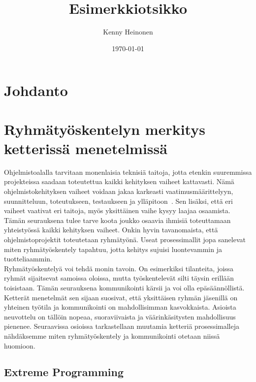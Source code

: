 \documentclass[finnish]{../tktltiki2}
\title{Esimerkkiotsikko}
\author{Kenny Heinonen}
\date{\today}
\theoremstyle{definition}
\theoremstyle{remark}
\begin{document}

\maketitle        %

\tableofcontents  %
\newpage          %



\section{Johdanto}

\section{Ryhmätyöskentelyn merkitys ketterissä menetelmissä}


Ohjelmistoalalla tarvitaan monenlaisia teknisiä taitoja, jotta etenkin suuremmissa projekteissa saadaan toteutettua kaikki kehityksen vaiheet kattavasti. Nämä ohjelmistokehityksen vaiheet voidaan jakaa karkeasti vaatimusmäärittelyyn, suunnitteluun, toteutukseen, testaukseen ja ylläpitoon~\cite{Capretz:2010:MSS:1726559.1726574}. Sen lisäksi, että eri vaiheet vaativat eri taitoja, myös yksittäinen vaihe kysyy laajaa osaamista. Tämän seurauksena tulee tarve koota joukko osaavia ihmisiä toteuttamaan yhteistyössä kaikki kehityksen vaiheet. Onkin hyvin tavanomaista, että ohjelmistoprojektit toteutetaan ryhmätyönä. Useat prosessimallit jopa sanelevat miten ryhmätyöskentely tapahtuu, jotta kehitys sujuisi luontevammin ja tuotteliaammin.\\

Ryhmätyöskentelyä voi tehdä monin tavoin. On esimerkiksi tilanteita, joissa ryhmät sijaitsevat samoissa oloissa, mutta työskentelevät silti täysin erillään toisistaan. Tämän seurauksena kommunikointi kärsii ja voi olla epäsäännöllistä. Ketterät menetelmät sen sijaan suosivat, että yksittäisen ryhmän jäsenillä on yhteinen työtila ja kommunikointi on mahdollisimman kasvokkaista. Asioista neuvottelu on tällöin nopeaa, suoraviivaista ja väärinkäsitysten mahdollisuus pienenee. Seuraavissa osioissa tarkastellaan muutamia ketteriä prosessimalleja nähdäksemme miten ryhmätyöskentely ja kommunikointi otetaan niissä huomioon.

\subsection{Extreme Programming}
\end{document}
